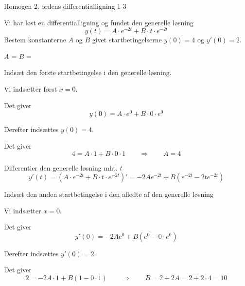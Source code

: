 \documentclass{article}
\begin{document}
\begin{exercise}{Homogen 2. ordens differentialligning 1-3}

Vi har løst en differentialligning og fundet den generelle løsning
\[
y(t) = A \cdot e^{-2t} + B \cdot t \cdot e^{-2t}
\]
Bestem konstanterne $A$ og $B$ givet startbetingelserne $y(0)=4$ og $y'(0)=2$.


$A$ = 
$B$ = 

\hint

Indsæt den første startbetingelse i den generelle løsning.


\hint

Vi indsætter først $x=0$.

\hint

Det giver
\[
y(0)= A \cdot e^{0} + B \cdot 0 \cdot e^{0}
\]

\hint

Derefter indsættes $y(0)=4$.

\hint

Det giver
\[
4 = A \cdot 1 + B \cdot 0 \cdot 1 \qquad \Rightarrow \qquad A = 4
\]

\hint

Differentier den generelle løsning mht. $t$
\[
y'(t)= \left(A \cdot e^{-2t} + B \cdot t \cdot e^{-2t} \right)' = -2A e^{-2t} + B \left( e^{-2t} -2 t e^{-2t} \right)
\]

\hint

Indsæt den anden startbetingelse i den afledte af den generelle løsning

\hint

Vi indsætter $x=0$.

\hint

Det giver
\[
y'(0) = -2A e^{0} + B \left( e^{0} - 0 \cdot e^{0} \right)
\]

\hint

Derefter indsættes $y'(0)=2$.

\hint

Det giver
\[
2 = -2A \cdot 1 + B \left(1 - 0 \cdot 1 \right) \qquad \Rightarrow \qquad B = 2 + 2A = 2 + 2 \cdot 4 = 10
\]


\end{exercise}

\newpage
\end{document}
